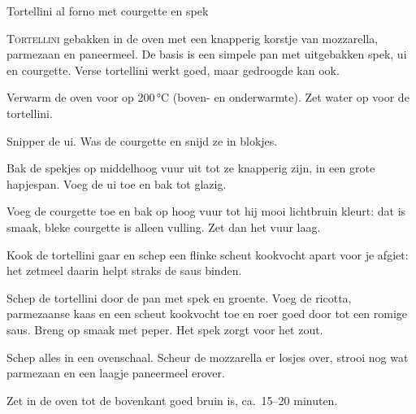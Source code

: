 \begin{recipe}{Tortellini al forno met courgette en spek}


\lettrine{T}{ortellini} gebakken in de oven met een knapperig korstje van
mozzarella, parmezaan en paneermeel. De basis is een simpele pan met
uitgebakken spek, ui en courgette. Verse tortellini werkt goed, maar gedroogde
kan ook.

\begin{ingredients}
\end{ingredients}

\begin{steps}
  \item Verwarm de oven voor op 200\,°C (boven- en onderwarmte). Zet water op voor de tortellini.
  \item Snipper de ui. Was de courgette en snijd ze in blokjes.
  \item Bak de spekjes op middelhoog vuur uit tot ze knapperig zijn, in een
        grote hapjespan. Voeg de ui toe en bak tot glazig.
  \item Voeg de courgette toe en bak op hoog vuur tot hij mooi lichtbruin
        kleurt: dat is smaak, bleke courgette is alleen vulling. Zet dan het
        vuur laag.
  \item Kook de tortellini gaar en schep een flinke scheut kookvocht apart voor
        je afgiet: het zetmeel daarin helpt straks de saus binden.
  \item Schep de tortellini door de pan met spek en groente. Voeg de ricotta,
        parmezaanse kaas en een scheut kookvocht toe en roer goed door tot een
        romige saus. Breng op smaak met peper. Het spek zorgt voor het zout.
  \item Schep alles in een ovenschaal. Scheur de mozzarella er losjes over,
        strooi nog wat parmezaan en een laagje paneermeel erover.
  \item Zet in de oven tot de bovenkant goed bruin is, ca.\ 15--20 minuten.
\end{steps}

\end{recipe}
